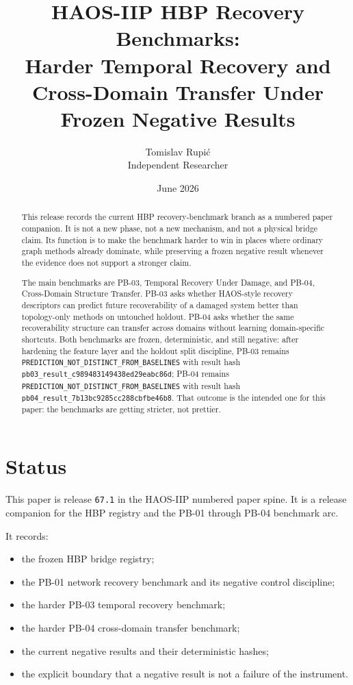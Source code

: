 \documentclass[11pt]{article}
\title{HAOS-IIP HBP Recovery Benchmarks:\\Harder Temporal Recovery and Cross-Domain Transfer Under Frozen Negative Results}
\author{Tomislav Rupi\'c \\ Independent Researcher}
\date{June 2026}
\begin{document}
\maketitle

\begin{abstract}
This release records the current HBP recovery-benchmark branch as a numbered paper companion. It is not a new phase, not a new mechanism, and not a physical bridge claim. Its function is to make the benchmark harder to win in places where ordinary graph methods already dominate, while preserving a frozen negative result whenever the evidence does not support a stronger claim.

The main benchmarks are PB-03, Temporal Recovery Under Damage, and PB-04, Cross-Domain Structure Transfer. PB-03 asks whether HAOS-style recovery descriptors can predict future recoverability of a damaged system better than topology-only methods on untouched holdout. PB-04 asks whether the same recoverability structure can transfer across domains without learning domain-specific shortcuts. Both benchmarks are frozen, deterministic, and still negative: after hardening the feature layer and the holdout split discipline, PB-03 remains \texttt{PREDICTION\_NOT\_DISTINCT\_FROM\_BASELINES} with result hash \texttt{pb03\_result\_c989483149438ed29eabc86d}; PB-04 remains \texttt{PREDICTION\_NOT\_DISTINCT\_FROM\_BASELINES} with result hash \texttt{pb04\_result\_7b13bc9285cc288cbfbe46b8}. That outcome is the intended one for this paper: the benchmarks are getting stricter, not prettier.
\end{abstract}

\section{Status}

This paper is release \texttt{67.1} in the HAOS-IIP numbered paper spine. It is a release companion for the HBP registry and the PB-01 through PB-04 benchmark arc.

It records:
\begin{itemize}
\item the frozen HBP bridge registry;
\item the PB-01 network recovery benchmark and its negative control discipline;
\item the harder PB-03 temporal recovery benchmark;
\item the harder PB-04 cross-domain transfer benchmark;
\item the current negative results and their deterministic hashes;
\item the explicit boundary that a negative result is not a failure of the instrument.
\end{itemize}
\end{document}
